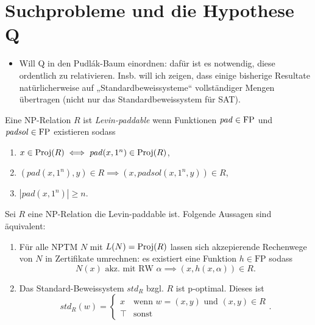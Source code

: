 \chapter{Suchprobleme und die Hypothese Q}

\begin{itemize}
    \item Will Q in den Pudlák-Baum einordnen: dafür ist es notwendig, diese ordentlich zu relativieren. Insb. will ich zeigen, dass einige bisherige Resultate natürlicherweise auf „Standardbeweissysteme“ vollständiger Mengen übertragen (nicht nur das Standardbeweissystem für SAT).
\end{itemize}

\begin{definition}
    Eine NP-Relation $R$ ist \emph{Levin-paddable} wenn 
    Funktionen $\mathit{pad}\in\mathrm{FP}$ und $\mathit{padsol}\in\mathrm{FP}$ existieren sodass
    \begin{enumerate}
        \item $x\in \operatorname{Proj}(R) \iff \mathit{pad}(x, 1^n) \in \operatorname{Proj}(R)$,
        \item $(\mathit{pad}(x, 1^n), y)\in R \implies (x, \mathit{padsol}(x, 1^n, y)) \in R$,
        \item $|\mathit{pad}(x, 1^n)|\geq n$.
    \end{enumerate}
\end{definition}

\begin{lemma}\label{lemma:stdps-q}
    Sei $R$ eine NP-Relation die Levin-paddable ist. Folgende Aussagen sind äquivalent:
    \begin{enumerate}
        \item Für alle NPTM $N$ mit $L(N)=\operatorname{Proj}(R)$ lassen sich akzepierende Rechenwege von $N$ in Zertifikate umrechnen: es existiert eine Funktion $h\in\mathrm{FP}$ sodass
            \[ N(x) \text{ akz. mit RW $\alpha$} \implies (x,h(x,\alpha))\in R. \]
        \item Das Standard-Beweissystem $\mathit{std}_R$ bzgl. $R$ ist p-optimal. Dieses ist
            \[ \mathit{std}_R(w) = \begin{cases} x & \text{wenn $w=(x,y)$ und $(x,y)\in R$}\\
            \top & \text{sonst}\end{cases}. \] 
    \end{enumerate}
\end{lemma}

